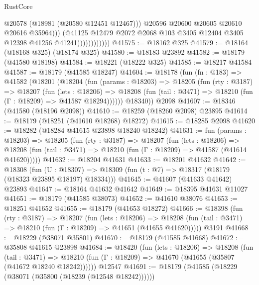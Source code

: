 \begin{lexlean}{RustCore}
\begin{coremodule}
                                  @20578
                                  (@18981 (@20580 @12451 @12467)))
                                @20596
                                @20600
                                @20605
                                @20610
                                @20616
                                @35964)))
                          (@41125
                            @12479
                            @2072
                            @2068
                            @103
                            @3405
                            @12404
                            @3405
                            @12398
                            @41256
                            @41241))))))))))))
@41575 := @18162 @325
@41579 := @18164 (@18168 @325) (@18174 @325)
@41580 := @18183 @23892
@41582 := @18179 (@41580 @18198)
@41584 := @18221 (@18222 @325)
@41585 := @18217 @41584
@41587 := @18179 (@41585 @18247)
@41604 := @18178
    (fun (fn : @183) =>
    @41582
      (@18201
        (@18204
          (fun (params : @18203) =>
          @18205
            (fun (rty : @3187) =>
            @18207
              (fun (lets : @18206) =>
              @18208 (fun (tail : @3471) => @18210 (fun (Γ : @18209) => @41587 @18294))))))
        @18340))
    @2098
@41607 := @18346 (@41580 (@18196 @2098))
@41610 := @18259 (@18260 @2098) @23895
@41614 := @18179 (@18251 (@41610 @18268) @18272)
@41615 := @18285 @2098
@41620 := @18282 (@18284 @41615 @23898 @18240 @18242)
@41631 := fun (params : @18203) =>
  @18205
    (fun (rty : @3187) =>
    @18207
      (fun (lets : @18206) =>
      @18208 (fun (tail : @3471) => @18210 (fun (Γ : @18209) => @41587 (@41614 @41620)))))
@41632 := @18204 @41631
@41633 := @18201 @41632
@41642 := @18308
    (fun (U : @18307) => @18309 (fun (t : @7) => @18317 (@18179 (@18323 @23895 @18197) @18334)))
@41645 := @41607 (@41633 @41642) @23893
@41647 := @18164 @41632 @41642
@41649 := @18395 @41631 @11027
@41651 := @18179 (@41585 @38073)
@41652 := @41610 @38076
@41653 := @18251 @41652
@41655 := @18179 (@41653 @18272)
@41666 := @18398
    (fun (rty : @3187) =>
    @18207
      (fun (lets : @18206) =>
      @18208 (fun (tail : @3471) => @18210 (fun (Γ : @18209) => @41651 (@41655 @41620)))))
    @3191
@41668 := @18229 (@38071 @35801)
@41670 := @18179 (@41585 @41668)
@41672 := @35808 @41615 @23898
@41684 := @18420
    (fun (lets : @18206) =>
    @18208
      (fun (tail : @3471) =>
      @18210 (fun (Γ : @18209) => @41670 (@41655 (@35807 (@41672 @18240 @18242))))))
    @12547
@41691 := @18179 (@41585 (@18229 (@38071 (@35800 (@18239 (@12548 @18242))))))

\end{coremodule}
\end{lexlean}
